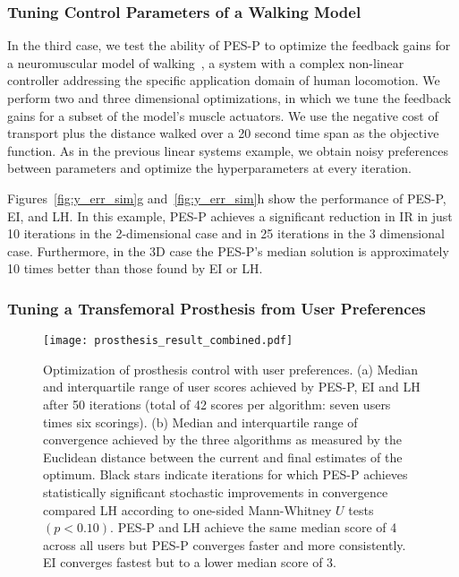 \subsubsection{Tuning Control Parameters of a Walking Model
    }\label{sec:sim_neuro}
In the third case, we test the ability of PES-P to optimize the feedback gains
for a neuromuscular model of walking~\citep{thatte2016toward}, a system with a
complex non-linear controller addressing the specific application domain of
human locomotion. We perform two and three dimensional optimizations, in which
we tune the feedback gains for a subset of the model's muscle actuators.  We use
the negative cost of transport plus the distance walked over a 20 second time
span as the objective function. As in the previous linear systems example, we
obtain noisy preferences between parameters and optimize the hyperparameters at
every iteration.

Figures~\ref{fig:y_err_sim}g and~\ref{fig:y_err_sim}h show the performance of
PES-P, EI, and LH\@. In this example, PES-P achieves a significant reduction in
IR in just 10 iterations in the 2-dimensional case and in 25 iterations in the 3
dimensional case.  Furthermore, in the 3D case the PES-P's median solution is
approximately 10 times better than those found by EI or LH\@. 

\subsubsection{Tuning a Transfemoral Prosthesis from User Preferences} 
\begin{figure*}[t]
    \centering
    \texttt{[image: prosthesis\_result\_combined.pdf]}
    \caption{Optimization of prosthesis control with user preferences. (a)
    Median and interquartile range of user scores achieved by PES-P, EI and LH
    after 50 iterations (total of 42 scores per algorithm: seven users times six
    scorings). (b) Median and interquartile range of convergence achieved by the
    three algorithms as measured by the Euclidean distance between the current
    and final estimates of the optimum. Black stars indicate iterations for
    which PES-P achieves statistically significant stochastic improvements in
    convergence compared LH according to one-sided Mann-Whitney $U$ tests $(p <
    0.10)$. PES-P and LH achieve the same median score of 4 across all users but
    PES-P converges faster and more consistently. EI converges fastest but to a
    lower median score of 3.}\label{fig:prosthesis_result}
\end{figure*}



